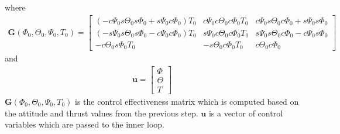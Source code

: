 \documentclass[11pt, a4paper, twoside]{report}
\begin{document}
where
\begin{equation}
	\begin{split}
		\bm{G}(\Phi_0, \Theta_0, \Psi_0, T_0) = 
		\begin{bmatrix}
			(-c\Psi_0 s\Theta_0 s\Phi_0 + s\Psi_0 c\Phi_0)T_0  &%
			c\Psi_0 c\Theta_0 c\Phi_0 T_0 &%
			c\Psi_0 s\Theta_0 c\Phi_0 + s\Psi_0 s\Phi_0 \\			
			(-s\Psi_0 s\Theta_0 s\Phi_0 - c\Psi_0 c\Phi_0)T_0 &%
			s\Psi_0 c\Theta_0 c\Phi_0 T_0 &%
			s\Psi_0 s\Theta_0 c\Phi_0 - c\Psi_0 s\Phi_0\\
			-c\Theta_0 s\Phi_0T_0 &%
			-s\Theta_0 c\Phi_0T_0 &%
			c\Theta_0 c\Phi_0
		\end{bmatrix}
		\label{eq:G}
	\end{split}
\end{equation}
and
\begin{equation}
	\begin{split}
		\bm{u} = 
		\begin{bmatrix}
			\Phi\\
			\Theta\\
			T
		\end{bmatrix}
		\label{eq:u_outer}
	\end{split}
\end{equation}
$\bm{G}(\Phi_0, \Theta_0, \Psi_0, T_0)$ is the control effectiveness matrix which is computed based on the attitude and thrust values from the previous step. $\bm{u}$ is a vector of control variables which are passed to the inner loop.
\end{document}
